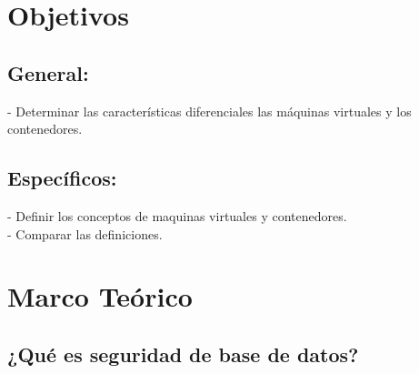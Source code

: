 \documentclass[%
 reprint,
 amsmath,amssymb,
 aps,
]{revtex4-1}
\begin{document}
\section{Objetivos}\label{sec:2}
\subsection{General:}
-  Determinar las características diferenciales las máquinas virtuales y los contenedores.
\subsection{Específicos:}
-  Definir los conceptos de maquinas virtuales y contenedores.\\
- Comparar las definiciones.

\section {Marco Teórico}

\subsection{¿Qué es seguridad de base de datos?}

\end{document}
